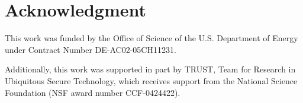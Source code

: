 \section*{Acknowledgment}

This work was funded by the Office of Science of the U.S. Department
of Energy under Contract Number DE-AC02-05CH11231.  

Additionally, this work was supported in part by TRUST, Team for Research in Ubiquitous Secure Technology, which receives support from the National Science Foundation (NSF award number CCF-0424422).